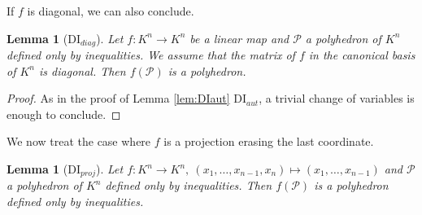 \documentclass[a4paper,oneside,10pt]{article}
\newtheorem{lemma}[theorem]{Lemma}
\newcommand{\PP}{\mathcal{P}}
\begin{document}
If $f$ is diagonal, we can also conclude.

\begin{lemma}[DI${}_{diag}$]
Let $f : K^n \to K^n$ be a linear map and $\PP$ a polyhedron of $K^n$ defined only by inequalities. We assume that the matrix of $f$ in the canonical basis of $K^n$ is diagonal.
Then $f(\PP)$ is a polyhedron. \label{lem:DIdiag}
\end{lemma}
\begin{proof}
As in the proof of Lemma \ref{lem:DIaut} DI${}_{aut}$, a trivial change
of variables is enough to conclude.
\end{proof}


We now treat the case where $f$ is a projection erasing the last coordinate.

\begin{lemma}[DI${}_{proj}$]
Let $f : K^n \to K^n, \: (x_1,\dots,x_{n-1},x_n) \mapsto (x_1,\dots,x_{n-1})$ and $\PP$ a polyhedron of $K^n$ defined only by inequalities. 
Then $f(\PP)$ is a polyhedron defined only by inequalities. \label{lem:DIproj}
\end{lemma}
\end{document}
